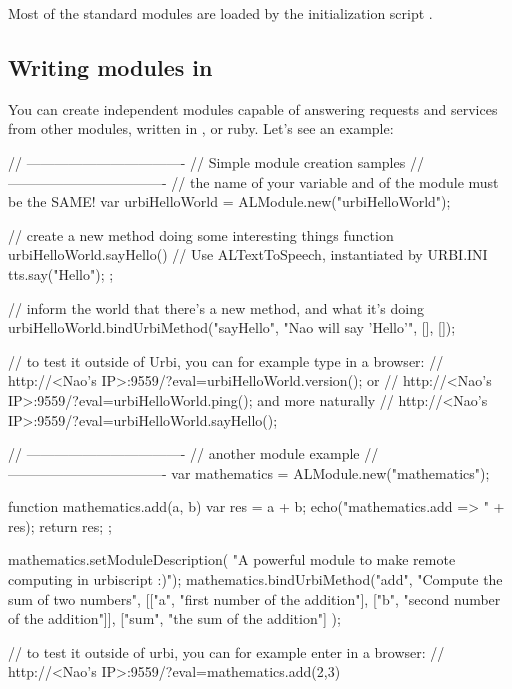 Most of the standard modules are loaded by the initialization script
.

\subsection{Writing \naoqi modules in \urbi}

You can create independent modules capable of answering requests and
services from other \naoqi modules, written in \Cxx, \us or
ruby. Let's see an example:

\begin{urbiunchecked}
// ----------------------------------
// Simple module creation samples
// ----------------------------------
// the name of your variable and of the module must be the SAME!
var urbiHelloWorld = ALModule.new("urbiHelloWorld");

// create a new method doing some interesting things
function urbiHelloWorld.sayHello()
{
  // Use ALTextToSpeech, instantiated by URBI.INI
  tts.say("Hello");
};

// inform the world that there's a new method, and what it's doing
urbiHelloWorld.bindUrbiMethod("sayHello", "Nao will say 'Hello'", [], []);

// to test it outside of Urbi, you can for example type in a browser:
// http://<Nao's IP>:9559/?eval=urbiHelloWorld.version(); or
// http://<Nao's IP>:9559/?eval=urbiHelloWorld.ping(); and more naturally
// http://<Nao's IP>:9559/?eval=urbiHelloWorld.sayHello();

// ----------------------------------
// another module example
// ----------------------------------
var mathematics = ALModule.new("mathematics");

function mathematics.add(a, b)
{
  var res = a + b;
  echo("mathematics.add => " + res);
  return res;
};

mathematics.setModuleDescription(
  "A powerful module to make remote computing in urbiscript :)");
mathematics.bindUrbiMethod("add", "Compute the sum of two numbers",
[["a",   "first number of the addition"],
 ["b",   "second number of the addition"]],
 ["sum", "the sum of the addition"] );

// to test it outside of urbi, you can for example enter in a browser:
// http://<Nao's IP>:9559/?eval=mathematics.add(2,3)
\end{urbiunchecked}


